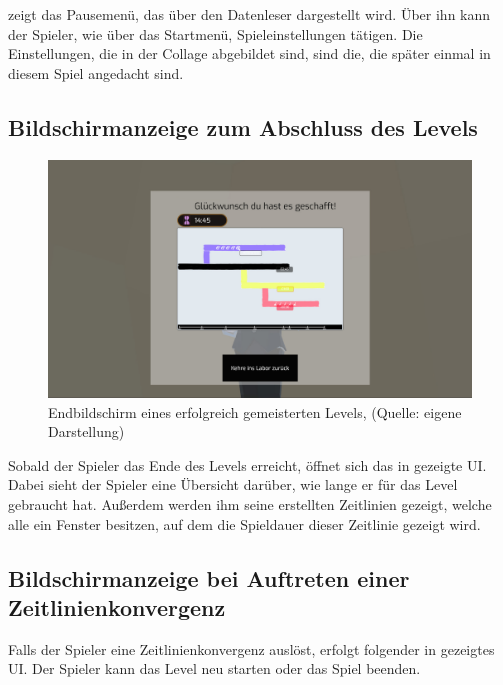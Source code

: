  zeigt das Pausemenü, das über den Datenleser dargestellt wird. Über ihn kann der Spieler, wie über das Startmenü, Spieleinstellungen tätigen. Die Einstellungen, die in der Collage abgebildet sind, sind die, die später einmal in diesem Spiel angedacht sind.

\subsection{Bildschirmanzeige zum Abschluss des Levels}

\begin{figure}[ht]
\centering
\includegraphics[width=1\linewidth]{content/pictures/Level Endscreen.jpg}
\caption{Endbildschirm eines erfolgreich gemeisterten Levels, (Quelle: eigene Darstellung)}
\label{fig:endscreen}
\end{figure}

Sobald der Spieler das Ende des Levels erreicht, öffnet sich das in  gezeigte \ac{UI}. Dabei sieht der Spieler eine Übersicht darüber, wie lange er für das Level gebraucht hat. Außerdem werden ihm seine erstellten Zeitlinien gezeigt, welche alle ein Fenster besitzen, auf dem die Spieldauer dieser Zeitlinie gezeigt wird.

\subsection{Bildschirmanzeige bei Auftreten einer Zeitlinienkonvergenz}

Falls der Spieler eine Zeitlinienkonvergenz auslöst, erfolgt folgender in  gezeigtes \ac{UI}. Der Spieler kann das Level neu starten oder das Spiel beenden.

